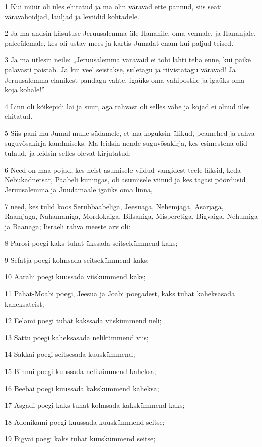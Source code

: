 \par 1 Kui müür oli üles ehitatud ja ma olin väravad ette pannud, siis seati väravahoidjad, lauljad ja leviidid kohtadele.
\par 2 Ja ma andsin käsutuse Jeruusalemma üle Hananile, oma vennale, ja Hananjale, paleeülemale, kes oli ustav mees ja kartis Jumalat enam kui paljud teised.
\par 3 Ja ma ütlesin neile: „Jeruusalemma väravaid ei tohi lahti teha enne, kui päike palavasti paistab. Ja kui veel seistakse, suletagu ja riivistatagu väravad! Ja Jeruusalemma elanikest pandagu vahte, igaüks oma vahipostile ja igaüks oma koja kohale!”
\par 4 Linn oli kõikepidi lai ja suur, aga rahvast oli selles vähe ja kojad ei olnud üles ehitatud.
\par 5 Siis pani mu Jumal mulle südamele, et ma koguksin ülikud, peamehed ja rahva suguvõsakirja kandmiseks. Ma leidsin nende suguvõsakirja, kes esimestena olid tulnud, ja leidsin selles olevat kirjutatud:
\par 6 Need on maa pojad, kes neist asumisele viidud vangidest teele läksid, keda Nebukadnetsar, Paabeli kuningas, oli asumisele viinud ja kes tagasi pöördusid Jeruusalemma ja Juudamaale igaüks oma linna,
\par 7 need, kes tulid koos Serubbaabeliga, Jeesuaga, Nehemjaga, Asarjaga, Raamjaga, Nahamaniga, Mordokaiga, Bilsaniga, Misperetiga, Bigvaiga, Nehumiga ja Baanaga; Iisraeli rahva meeste arv oli:
\par 8 Parosi poegi kaks tuhat ükssada seitsekümmend kaks;
\par 9 Sefatja poegi kolmsada seitsekümmend kaks;
\par 10 Aarahi poegi kuussada viiskümmend kaks;
\par 11 Pahat-Moabi poegi, Jeesua ja Joabi poegadest, kaks tuhat kaheksasada kaheksateist;
\par 12 Eelami poegi tuhat kakssada viiskümmend neli;
\par 13 Sattu poegi kaheksasada nelikümmend viis;
\par 14 Sakkai poegi seitsesada kuuskümmend;
\par 15 Binnui poegi kuussada nelikümmend kaheksa;
\par 16 Beebai poegi kuussada kakskümmend kaheksa;
\par 17 Asgadi poegi kaks tuhat kolmsada kakskümmend kaks;
\par 18 Adonikami poegi kuussada kuuskümmend seitse;
\par 19 Bigvai poegi kaks tuhat kuuskümmend seitse;
